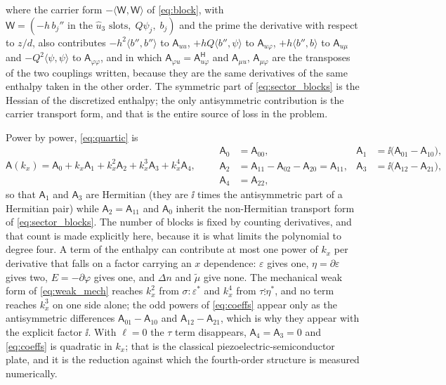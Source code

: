 where the carrier form $-\langle\mathsf W,\mathsf W\rangle$ of \eqref{eq:block}, with
$\mathsf W=(-h\,b_j''\text{ in the }\widehat u_3\text{ slots},\;Q\psi_j,\;b_j)$ and the prime the derivative with respect to $z/d$,
also contributes $-h^{2}\langle b'',b''\rangle$ to $\mathsf A_{uu}$, $+hQ\langle b'',\psi\rangle$ to $\mathsf A_{u\varphi}$,
$+h\langle b'',b\rangle$ to $\mathsf A_{u\mu}$ and $-Q^{2}\langle\psi,\psi\rangle$ to $\mathsf A_{\varphi\varphi}$, and in which
$\mathsf A_{\varphi u}=\mathsf A_{u\varphi}^{\mathsf H}$ and
$\mathsf A_{\mu u}$, $\mathsf A_{\mu\varphi}$ are the transposes of the two
couplings written, because they are the same derivatives of the same enthalpy
taken in the other order.  The symmetric part of \eqref{eq:sector_blocks} is the
Hessian of the discretized enthalpy; the only antisymmetric contribution is the
carrier transport form, and that is the entire source of loss in the problem.

Power by power, \eqref{eq:quartic} is
\begin{equation}
\label{eq:coeffs}
\mathsf A(k_x)=\mathsf A_0+k_x\mathsf A_1+k_x^{2}\mathsf A_2
+k_x^{3}\mathsf A_3+k_x^{4}\mathsf A_4,
\qquad
\begin{aligned}
\mathsf A_0&=\mathsf A_{00},&
\mathsf A_1&=\ii\bigl(\mathsf A_{01}-\mathsf A_{10}\bigr),\\
\mathsf A_2&=\mathsf A_{11}-\mathsf A_{02}-\mathsf A_{20}=\mathsf A_{11},&
\mathsf A_3&=\ii\bigl(\mathsf A_{12}-\mathsf A_{21}\bigr),\\
\mathsf A_4&=\mathsf A_{22},&&
\end{aligned}
\end{equation}
so that $\mathsf A_1$ and $\mathsf A_3$ are Hermitian (they are $\ii$ times the
antisymmetric part of a Hermitian pair) while $\mathsf A_2=\mathsf A_{11}$ and
$\mathsf A_0$ inherit the non-Hermitian transport form of
\eqref{eq:sector_blocks}.  The number of blocks is fixed by counting derivatives,
and that count is made explicitly here, because it is what limits the
polynomial to degree four.  A term of the enthalpy can contribute at most one
power of $k_x$ per derivative that falls on a factor carrying an $x$ dependence:
$\varepsilon$ gives one, $\eta=\partial\varepsilon$ gives two, $E=-\partial
\varphi$ gives one, and $\Delta n$ and $\widetilde\mu$ give none.  The
mechanical weak form of \eqref{eq:weak_mech} reaches $k_x^{2}$ from
$\sigma:\varepsilon^{*}$ and $k_x^{4}$ from $\tau\vdots\eta^{*}$, and no term
reaches $k_x^{3}$ on one side alone; the odd powers of \eqref{eq:coeffs} appear
only as the antisymmetric differences $\mathsf A_{01}-\mathsf A_{10}$ and
$\mathsf A_{12}-\mathsf A_{21}$, which is why they appear with the explicit factor
$\ii$.  With $\ell=0$ the $\tau$ term disappears, $\mathsf A_4=\mathsf A_3=0$ and
\eqref{eq:coeffs} is quadratic in $k_x$; that is the classical
piezoelectric-semiconductor plate, and it is the reduction against which the
fourth-order structure is measured numerically.

